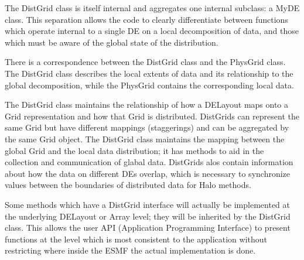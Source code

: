 



The DistGrid class is itself internal and aggregates one internal
subclass: a MyDE class.  This separation allows the code to clearly
differentiate between functions which operate internal to a single DE
on a local decomposition of data, and those which must be aware of the
global state of the distribution.

There is a correspondence between the DistGrid class and the PhysGrid
class.  The DistGrid class describes the local extents of data and
its relationship to the global decomposition, while the PhysGrid contains 
the corresponding local data.  

The DistGrid class maintains the relationship of how a DELayout maps onto
a Grid representation and how that Grid is distributed.  DistGrids can
represent the same Grid but have different mappings (staggerings) and can
be aggregated by the same Grid object. The DistGrid class maintains the
mapping between the global Grid and the local data distribution;  it has
methods to aid in the collection and communication of glabal data.  
DistGrids alos contain information about how the data on different DEs
overlap, which is necessary to synchronize values between the boundaries
of distributed data for Halo methods.

Some methods which have a DistGrid interface will actually be
implemented at the underlying DELayout or Array level; they
will be inherited by the DistGrid class.  This allows the user
API (Application Programming Interface) to present functions at
the level which is most consistent to the application without
restricting where inside the ESMF the actual implementation
is done.
